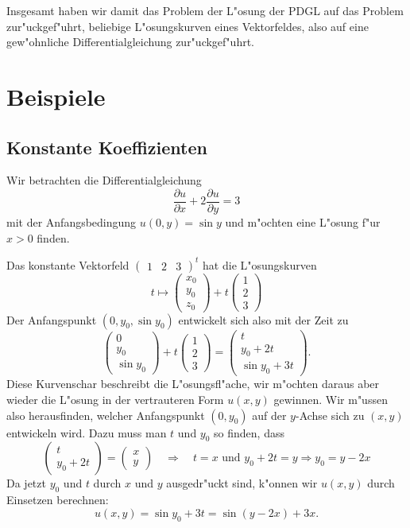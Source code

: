 Insgesamt haben wir damit das Problem der L"osung der PDGL auf das Problem 
zur"uckgef"uhrt, beliebige L"osungskurven eines Vektorfeldes, also auf
eine gew"ohnliche Differentialgleichung zur"uckgef"uhrt.


\section{Beispiele}
\subsection{Konstante Koeffizienten\label{konstantekoeff}}
Wir betrachten die Differentialgleichung
$$
\frac{\partial u}{\partial x}+2\frac{\partial u}{\partial y}=3
$$
mit der Anfangsbedingung $u(0,y)=\sin y$ und m"ochten eine L"osung f"ur
$x>0$ finden.

Das konstante Vektorfeld $\begin{pmatrix}1&2&3\end{pmatrix}^t$ hat die
L"osungskurven
$$
t\mapsto\begin{pmatrix}x_0\\y_0\\z_0\end{pmatrix}+t\begin{pmatrix}1\\2\\3\end{pmatrix}
$$
Der Anfangspunkt $(0,y_0,\sin y_0)$ entwickelt sich also mit der Zeit zu
$$
\begin{pmatrix}0\\y_0\\\sin y_0\end{pmatrix}+t\begin{pmatrix}1\\2\\3\end{pmatrix}
=
\begin{pmatrix}
t\\
y_0+2t\\
\sin y_0+3t
\end{pmatrix}.
$$
Diese Kurvenschar beschreibt die L"osungsfl"ache, wir m"ochten daraus aber
wieder die L"osung in der vertrauteren Form $u(x,y)$ gewinnen. Wir m"ussen
also herausfinden, welcher Anfangspunkt $(0,y_0)$ auf der $y$-Achse sich
zu $(x,y)$ entwickeln wird. Dazu muss man $t$ und $y_0$ so finden, dass
$$
\begin{pmatrix}
t\\
y_0+2t
\end{pmatrix}
=
\begin{pmatrix}
x\\y
\end{pmatrix}
\quad
\Rightarrow
\quad
t=x\text{ und } y_0+2t=y \Rightarrow y_0=y-2x
$$
Da jetzt $y_0$ und $t$ durch $x$ und $y$ ausgedr"uckt sind, k"onnen wir
$u(x,y)$ durch Einsetzen berechnen:
$$
u(x,y)=\sin y_0+3t=\sin(y-2x)+3x.
$$

